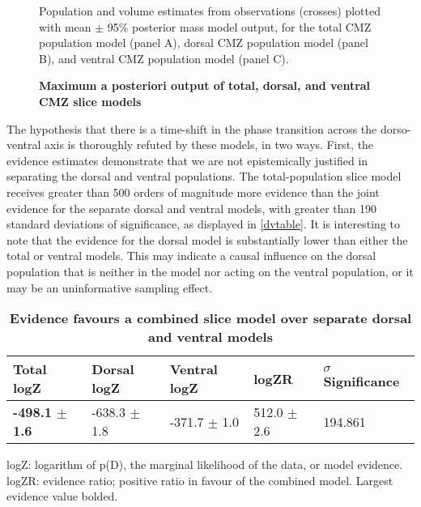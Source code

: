 \begin{figure}[!h]
    \caption{{\bf Maximum a posteriori output of total, dorsal, and ventral CMZ slice models}}
    \label{dvMAPout}
    Population and volume estimates from observations (crosses) plotted with mean $\pm$ 95\% posterior mass model output, for the total CMZ population model (panel A), dorsal CMZ population model (panel B), and ventral CMZ population model (panel C).
\end{figure}

The hypothesis that there is a time-shift in the phase transition across the dorso-ventral axis is thoroughly refuted by these models, in two ways. First, the evidence estimates demonstrate that we are not epistemically justified in separating the dorsal and ventral populations. The total-population slice model receives greater than 500 orders of magnitude more evidence than the joint evidence for the separate dorsal and ventral models, with greater than 190 standard deviations of significance, as displayed in \autoref{dvtable}. It is interesting to note that the evidence for the dorsal model is substantially lower than either the total or ventral models. This may indicate a causal influence on the dorsal population that is neither in the model nor acting on the ventral population, or it may be an uninformative sampling effect. 

\begin{table}[!ht]
    \centering
    \caption{{\bf Evidence favours a combined slice model over separate dorsal and ventral models}}
    \begin{tabular}{|l|l|l|l|l|}
        \hline
        {\bf Total logZ} & {\bf Dorsal logZ} & {\bf Ventral logZ} & {\bf logZR} & {\bf $\sigma$ Significance}\\ \hline
        {\bf -498.1 $\pm$ 1.6} & -638.3 $\pm$ 1.8 & -371.7 $\pm$ 1.0 & 512.0 $\pm$ 2.6 & 194.861\\ \hline
        \end{tabular}
    \begin{flushleft} logZ: logarithm of p(D), the marginal likelihood of the data, or model evidence. logZR: evidence ratio; positive ratio in favour of the combined model. Largest evidence value bolded.
    \end{flushleft}
    \label{dvtable}
\end{table}

